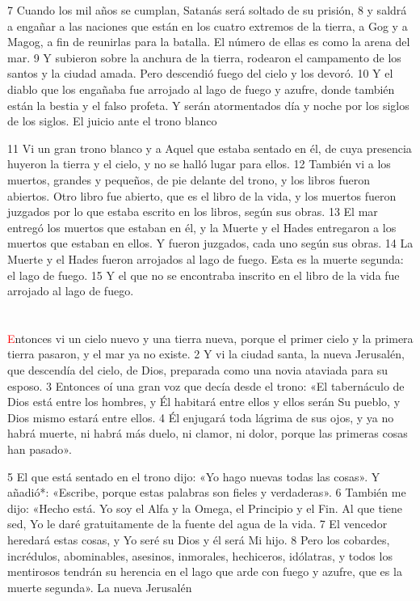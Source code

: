 \documentclass[12pt,twocolumn,twoside]{book}
\begin{document}
7 Cuando los mil años se cumplan, Satanás será soltado de su prisión, 8 y saldrá a engañar a las naciones que están en los cuatro extremos de la tierra, a Gog y a Magog, a fin de reunirlas para la batalla. El número de ellas es como la arena del mar. 9 Y subieron sobre la anchura de la tierra, rodearon el campamento de los santos y la ciudad amada. Pero descendió fuego del cielo y los devoró. 10 Y el diablo que los engañaba fue arrojado al lago de fuego y azufre, donde también están la bestia y el falso profeta. Y serán atormentados día y noche por los siglos de los siglos.
El juicio ante el trono blanco

11 Vi un gran trono blanco y a Aquel que estaba sentado en él, de cuya presencia huyeron la tierra y el cielo, y no se halló lugar para ellos. 12 También vi a los muertos, grandes y pequeños, de pie delante del trono, y los libros fueron abiertos. Otro libro fue abierto, que es el libro de la vida, y los muertos fueron juzgados por lo que estaba escrito en los libros, según sus obras. 13 El mar entregó los muertos que estaban en él, y la Muerte y el Hades entregaron a los muertos que estaban en ellos. Y fueron juzgados, cada uno según sus obras. 14 La Muerte y el Hades fueron arrojados al lago de fuego. Esta es la muerte segunda: el lago de fuego. 15 Y el que no se encontraba inscrito en el libro de la vida fue arrojado al lago de fuego.
\chapter{}
\lettrine[lines=4]{\textcolor{red}{E}}{}ntonces vi un cielo nuevo y una tierra nueva, porque el primer cielo y la primera tierra pasaron, y el mar ya no existe. 2 Y vi la ciudad santa, la nueva Jerusalén, que descendía del cielo, de Dios, preparada como una novia ataviada para su esposo. 3 Entonces oí una gran voz que decía desde el trono: «El tabernáculo de Dios está entre los hombres, y Él habitará entre ellos y ellos serán Su pueblo, y Dios mismo estará entre ellos. 4 Él enjugará toda lágrima de sus ojos, y ya no habrá muerte, ni habrá más duelo, ni clamor, ni dolor, porque las primeras cosas han pasado».

5 El que está sentado en el trono dijo: «Yo hago nuevas todas las cosas». Y añadió*: «Escribe, porque estas palabras son fieles y verdaderas». 6 También me dijo: «Hecho está. Yo soy el Alfa y la Omega, el Principio y el Fin. Al que tiene sed, Yo le daré gratuitamente de la fuente del agua de la vida. 7 El vencedor heredará estas cosas, y Yo seré su Dios y él será Mi hijo. 8 Pero los cobardes, incrédulos, abominables, asesinos, inmorales, hechiceros, idólatras, y todos los mentirosos tendrán su herencia en el lago que arde con fuego y azufre, que es la muerte segunda».
La nueva Jerusalén
\end{document}

